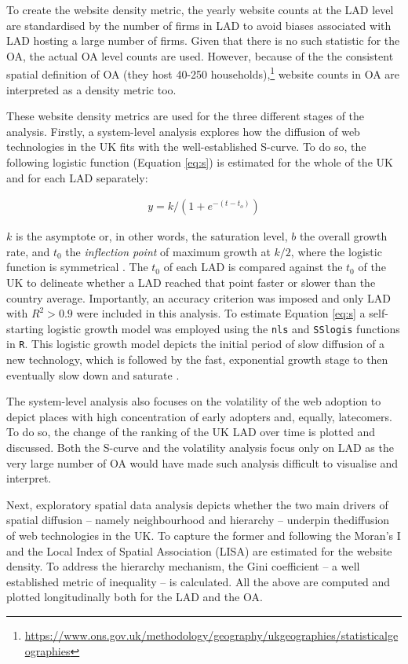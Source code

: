 \documentclass[
  authoryear,
  preprint,
  3p]{elsarticle}
\begin{document}
To create the website density metric, the yearly website counts at the
LAD level are standardised by the number of firms in LAD to avoid biases
associated with LAD hosting a large number of firms. Given that there is
no such statistic for the OA, the actual OA level counts are used.
However, because of the the consistent spatial definition of OA (they
host 40-250 households),\footnote{\url{https://www.ons.gov.uk/methodology/geography/ukgeographies/statisticalgeographies}}
website counts in OA are interpreted as a density metric too.

These website density metrics are used for the three different stages of
the analysis. Firstly, a system-level analysis explores how the
diffusion of web technologies in the UK fits with the well-established
S-curve. To do so, the following logistic function (Equation \ref{eq:s})
is estimated for the whole of the UK and for each LAD separately:

\begin{align}
y = k /(1 + e^{-(t-t_{o})})\label{eq:s}
\end{align}

\noindent \(k\) is the asymptote or, in other words, the saturation
level, \(b\) the overall growth rate, and \(t_{0}\) the \emph{inflection
point} of maximum growth at \(k/2\), where the logistic function is
symmetrical \citep{wilson201281}. The \(t_0\) of each LAD is compared
against the \(t_0\) of the UK to delineate whether a LAD reached that
point faster or slower than the country average. Importantly, an
accuracy criterion was imposed and only LAD with \(R^2 > 0.9\) were
included in this analysis. To estimate Equation \ref{eq:s} a
self-starting logistic growth model was employed using the \texttt{nls}
and \texttt{SSlogis} functions in \texttt{R}. This logistic growth model
depicts the initial period of slow diffusion of a new technology, which
is followed by the fast, exponential growth stage to then eventually
slow down and saturate \citep{wilson201281, grubler1999dynamics}.

The system-level analysis also focuses on the volatility of the web
adoption to depict places with high concentration of early adopters and,
equally, latecomers. To do so, the change of the ranking of the UK LAD
over time is plotted and discussed. Both the S-curve and the volatility
analysis focus only on LAD as the very large number of OA would have
made such analysis difficult to visualise and interpret.

Next, exploratory spatial data analysis depicts whether the two main
drivers of spatial diffusion -- namely neighbourhood and hierarchy --
underpin thediffusion of web technologies in the UK. To capture the
former and following \citet{ding2010modeling} the Moran's I and the
Local Index of Spatial Association (LISA) are estimated for the website
density. To address the hierarchy mechanism, the Gini coefficient -- a
well established metric of inequality -- is calculated. All the above
are computed and plotted longitudinally both for the LAD and the OA.
\end{document}
